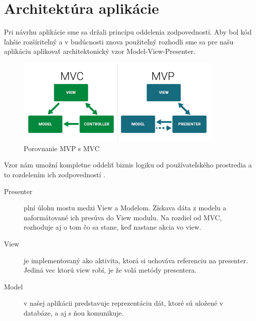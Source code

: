 \section{Architektúra aplikácie}
Pri návrhu aplikácie sme sa držali princípu oddelenia zodpovedností. Aby bol kód ľahšie rozšíriteľný a v budúcnosti znova použiteľný rozhodli sme sa pre našu aplikáciu aplikovať architektonický vzor
Model-View-Presenter. 
\vspace{10pt}
\begin{figure}[H]
    \begin{center}
        \begin{minipage}{0.9\linewidth}
            \begin{center}
                \includegraphics[width=0.9\textwidth]{images/MVC_MVP.png}
                \caption{Porovnanie MVP s MVC }
                \label{obr3.1}
            \end{center}
        \end{minipage}
    \end{center}
\end{figure}
\vspace{10pt}

Vzor nám umožní kompletne oddeliť biznis logiku od používateľského prostredia a to rozdelením ich zodpovedností \cite{mvpdef}.

\begin{description}
\item[Presenter]
 plní úlohu mostu medzi View a Modelom. Získava dáta z modelu a naformátované ich presúva do View modulu. Na rozdiel od MVC, rozhoduje aj o tom čo sa stane, keď nastane akcia vo view. 

\item[View]
 je implementovaný ako aktivita, ktorá si uchováva referenciu na presenter. Jediná vec ktorú view robí, je že volá metódy presentera.

\item[Model]
 v našej aplikácii predstavuje reprezentáciu dát, ktoré sú uložené v databáze, a aj s ňou komunikuje.

\end{description}

